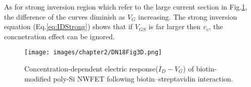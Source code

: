 As for strong inversion region which refer to the large current section in Fig.\ref{fig:DN17Fig6d}, the difference of the curves diminish as $V_G$ increasing.
The strong inversion equation (Eq.\ref{eq:IDStrong}) shows that if $V_{GS}$ is far larger then $v_c$, the concnetration effect can be ignored.

\begin{figure}[!htbp]
    \centering
    \texttt{[image: images/chapter2/DN18Fig3D.png]}
    \caption{Concentration-dependent electric response($I_D-V_G$) of biotin-modified poly-Si NWFET following biotin–streptavidin interaction.\cite{DN17}}
    \label{fig:DN17Fig6d}
\end{figure}









%
